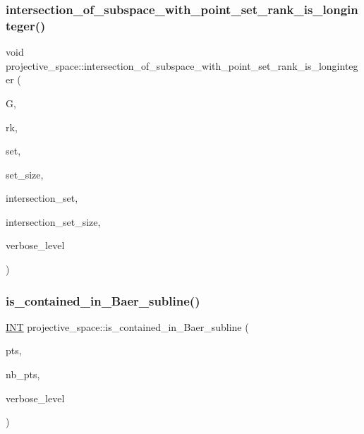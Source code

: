 \subsubsection{\texorpdfstring{intersection\+\_\+of\+\_\+subspace\+\_\+with\+\_\+point\+\_\+set\+\_\+rank\+\_\+is\+\_\+longinteger()}{intersection\_of\_subspace\_with\_point\_set\_rank\_is\_longinteger()}}
{\footnotesize\ttfamily void projective\+\_\+space\+::intersection\+\_\+of\+\_\+subspace\+\_\+with\+\_\+point\+\_\+set\+\_\+rank\+\_\+is\+\_\+longinteger (\begin{DoxyParamCaption}\item[{\mbox{\hyperlink{classgrassmann}{grassmann}} $\ast$}]{G,  }\item[{\mbox{\hyperlink{classlonginteger__object}{longinteger\+\_\+object}} \&}]{rk,  }\item[{\mbox{\hyperlink{galois_8h_a09fddde158a3a20bd2dcadb609de11dc}{I\+NT}} $\ast$}]{set,  }\item[{\mbox{\hyperlink{galois_8h_a09fddde158a3a20bd2dcadb609de11dc}{I\+NT}}}]{set\+\_\+size,  }\item[{\mbox{\hyperlink{galois_8h_a09fddde158a3a20bd2dcadb609de11dc}{I\+NT}} $\ast$\&}]{intersection\+\_\+set,  }\item[{\mbox{\hyperlink{galois_8h_a09fddde158a3a20bd2dcadb609de11dc}{I\+NT}} \&}]{intersection\+\_\+set\+\_\+size,  }\item[{\mbox{\hyperlink{galois_8h_a09fddde158a3a20bd2dcadb609de11dc}{I\+NT}}}]{verbose\+\_\+level }\end{DoxyParamCaption})}

\mbox{\label{classprojective__space_a6730e59a3a7c1f50d671671c628144be}} 
\subsubsection{\texorpdfstring{is\+\_\+contained\+\_\+in\+\_\+\+Baer\+\_\+subline()}{is\_contained\_in\_Baer\_subline()}}
{\footnotesize\ttfamily \mbox{\hyperlink{galois_8h_a09fddde158a3a20bd2dcadb609de11dc}{I\+NT}} projective\+\_\+space\+::is\+\_\+contained\+\_\+in\+\_\+\+Baer\+\_\+subline (\begin{DoxyParamCaption}\item[{\mbox{\hyperlink{galois_8h_a09fddde158a3a20bd2dcadb609de11dc}{I\+NT}} $\ast$}]{pts,  }\item[{\mbox{\hyperlink{galois_8h_a09fddde158a3a20bd2dcadb609de11dc}{I\+NT}}}]{nb\+\_\+pts,  }\item[{\mbox{\hyperlink{galois_8h_a09fddde158a3a20bd2dcadb609de11dc}{I\+NT}}}]{verbose\+\_\+level }\end{DoxyParamCaption})}

